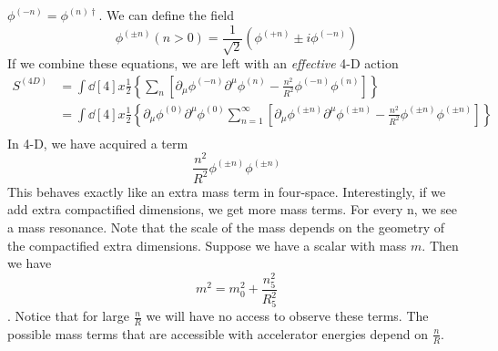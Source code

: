 \documentclass[12pt]{article}
\newcommand{\pd}{\partial}
\begin{document}
$\phi^{(-n)} = \phi^{(n)\dagger}$. We can define the field
\begin{equation}
    \phi^{(\pm n)}(n > 0) = \frac{1}{\sqrt{2}} \left( \phi^{(+n)} \pm i\phi^{(-n)} \right)
\end{equation}
If we combine these equations, we are left with an \textit{effective} 4-D action
\begin{align}
    S^{(4D)} &= \int \dd[4]{x} \frac{1}{2} \left\{ \sum_n \left[
    \pd_\mu\phi^{(-n)}\pd^\mu\phi^{(n)} - \frac{n^2}{R^2}\phi^{(-n)}\phi^{(n)}
\right] \right\} \\
             &= \int \dd[4]{x} \frac{1}{2} \left\{
                 \pd_\mu\phi^{(0)}\pd^\mu\phi^{(0)} \sum_{n=1}^{\infty} \left[
    \pd_\mu\phi^{(\pm n)}\pd^\mu\phi^{(\pm n)} - \frac{n^2}{R^2}\phi^{(\pm
    n)}\phi^{(\pm n)}
\right] \right\} \\
\end{align}
In 4-D, we have acquired a term
\begin{equation}
    \frac{n^2}{R^2}\phi^{(\pm n)}\phi^{(\pm n)}
\end{equation}
This behaves exactly like an extra mass term in four-space. Interestingly, if we
add extra compactified dimensions, we get more mass terms. For every n, we see a
mass resonance. Note that the scale of the mass depends on the geometry of the
compactified extra dimensions. Suppose we have a scalar with mass $m$. Then we
have $$m^2 = m_0^2 + \frac{n_5^2}{R_5^2}$$. Notice that for large $\frac{n}{R}$
we will have no access to observe these terms. The possible mass terms that are
accessible with accelerator energies depend on $\frac{n}{R}$.
\end{document}
